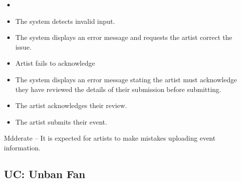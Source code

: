 \documentclass[11pt]{report}
\begin{document}
\begin{description}[leftmargin=2.2cm, style=nextline]
\begin{enumerate}
    \end{enumerate}
  \item[Extensions]
    \begin{itemize}
      \item[5a. Invalid Input]
        \item The system detects invalid input.
        \item The system displays an error message and requests the artist correct the issue.
      \item[6a.] Artist fails to acknowledge
        \item The system displays an error message stating the artist must acknowledge they have reviewed the details of their submission before submitting.
        \item The artist acknowledges their review.
        \item The artist submits their event.

    \end{itemize}
  \item[Frequency of Occurrence] Mdderate -- It is expected for artists to make mistakes uploading event information.
\end{description}


\subsection{UC: Unban Fan}
\end{document}
